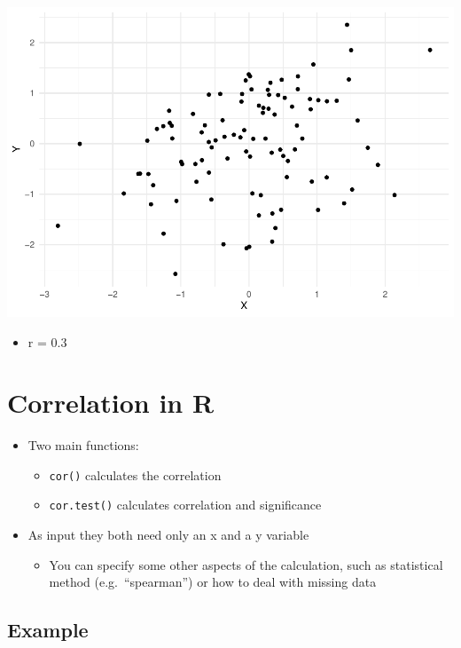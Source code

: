 \documentclass[
]{book}
\providecommand{\tightlist}{%
  \setlength{\itemsep}{0pt}\setlength{\parskip}{0pt}}
\begin{document}
\includegraphics{_main_files/figure-latex/unnamed-chunk-69-1.pdf}

\begin{itemize}
\tightlist
\item
  r = 0.3
\end{itemize}

\section{Correlation in R}\label{correlation-in-r}

\begin{itemize}
\tightlist
\item
  Two main functions:

  \begin{itemize}
  \tightlist
  \item
    \texttt{cor()} calculates the correlation
  \item
    \texttt{cor.test()} calculates correlation and significance
  \end{itemize}
\item
  As input they both need only an x and a y variable

  \begin{itemize}
  \tightlist
  \item
    You can specify some other aspects of the calculation, such as statistical method (e.g.~``spearman'') or how to deal with missing data
  \end{itemize}
\end{itemize}

\subsection{Example}\label{example-2}
\end{document}

